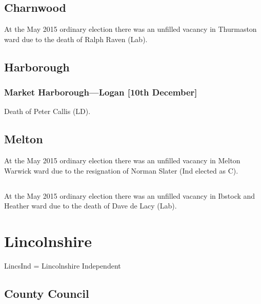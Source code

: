 \documentclass[a4paper,openany]{book}
\begin{document}
\begin{resultsiii}
\subsection*{Charnwood}

At the May 2015 ordinary election there was an unfilled vacancy in Thurmaston ward due to the death of Ralph Raven (Lab).

\subsection*{Harborough}

\subsubsection*{Market Harborough---Logan \hspace*{\fill}\nolinebreak[1]%
\enspace\hspace*{\fill}
[10th December]}


Death of Peter Callis (LD).

\subsection*{Melton}

At the May 2015 ordinary election there was an unfilled vacancy in Melton Warwick ward due to the resignation of Norman Slater (Ind elected as C).

\subsection*{}

At the May 2015 ordinary election there was an unfilled vacancy in Ibstock and Heather ward due to the death of Dave de Lacy (Lab).

\section{Lincolnshire}

LincsInd = Lincolnshire Independent

\subsection*{County Council}


\end{resultsiii}
\end{document}
